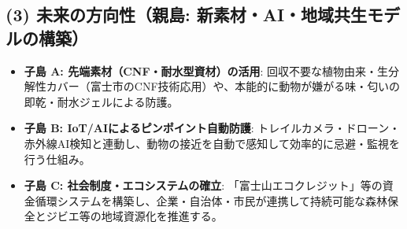 \documentclass[uplatex, 11pt, a4paper]{bxjsarticle}
\begin{document}
\subsection*{(3) 未来の方向性（親島: 新素材・AI・地域共生モデルの構築）}
\begin{itemize}[label=--]
    \item \textbf{子島 A: 先端素材（CNF・耐水型資材）の活用}: 回収不要な植物由来・生分解性カバー（富士市のCNF技術応用）や、本能的に動物が嫌がる味・匂いの即乾・耐水ジェルによる防護。
    \item \textbf{子島 B: IoT/AIによるピンポイント自動防護}: トレイルカメラ・ドローン・赤外線AI検知と連動し、動物の接近を自動で感知して効率的に忌避・監視を行う仕組み。
    \item \textbf{子島 C: 社会制度・エコシステムの確立}: 「富士山エコクレジット」等の資金循環システムを構築し、企業・自治体・市民が連携して持続可能な森林保全とジビエ等の地域資源化を推進する。
\end{itemize}
\end{document}
